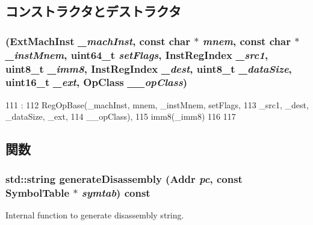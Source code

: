 \subsection{コンストラクタとデストラクタ}
\hypertarget{classX86ISA_1_1RegOpImm_ae92bb41f49c86a1b1f95406cd75d9243}{
\subsubsection[{RegOpImm}]{ ({\bf ExtMachInst} {\em \_\-machInst}, \/  const char $\ast$ {\em mnem}, \/  const char $\ast$ {\em \_\-instMnem}, \/  uint64\_\-t {\em setFlags}, \/  {\bf InstRegIndex} {\em \_\-src1}, \/  uint8\_\-t {\em \_\-imm8}, \/  {\bf InstRegIndex} {\em \_\-dest}, \/  uint8\_\-t {\em \_\-dataSize}, \/  uint16\_\-t {\em \_\-ext}, \/  OpClass {\em \_\-\_\-opClass})}}
\label{classX86ISA_1_1RegOpImm_ae92bb41f49c86a1b1f95406cd75d9243}



\begin{DoxyCode}
111                                    :
112             RegOpBase(_machInst, mnem, _instMnem, setFlags,
113                     _src1, _dest, _dataSize, _ext,
114                     __opClass),
115             imm8(_imm8)
116         {
117         }

\end{DoxyCode}


\subsection{関数}
\hypertarget{classX86ISA_1_1RegOpImm_a95d323a22a5f07e14d6b4c9385a91896}{
\subsubsection[{generateDisassembly}]{\setlength{\rightskip}{0pt plus 5cm}std::string generateDisassembly ({\bf Addr} {\em pc}, \/  const {\bf SymbolTable} $\ast$ {\em symtab}) const}}
\label{classX86ISA_1_1RegOpImm_a95d323a22a5f07e14d6b4c9385a91896}
Internal function to generate disassembly string. 

